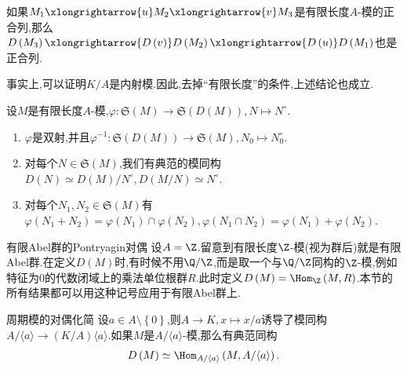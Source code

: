 \begin{proposition}{}{}
	如果$M_{1}\xlongrightarrow{u}M_{2}\xlongrightarrow{v}M_{3}$是有限长度$A$-模的正合列,那么$D\left(M_{3}\right)\xlongrightarrow{D\left(v\right)}D\left(M_{2}\right)\xlongrightarrow{D\left(u\right)}D\left(M_{1}\right)$也是正合列.
\end{proposition}

\begin{remark}{}{}
	事实上,可以证明$K/A$是内射模.因此,去掉``有限长度''的条件,上述结论也成立.
\end{remark}

\begin{proposition}{}{}
	设$M$是有限长度$A$-模,$\varphi:\mathfrak{S}\left(M\right)\to\mathfrak{S}\left(D\left(M\right)\right),N\mapsto N^{\circ}$.
	\begin{enumerate}
		\item $\varphi$是双射,并且$\varphi^{-1}:\mathfrak{S}\left(D\left(M\right)\right)\to\mathfrak{S}\left(M\right),N_{0}\mapsto N_{0}^{\circ}$.
		\item 对每个$N\in\mathfrak{S}\left(M\right)$,我们有典范的模同构$D\left(N\right)\simeq D\left(M\right)/N^{\circ},D\left(M/N\right)\simeq N^{\circ}$.
		\item 对每个$N_{1},N_{2}\in\mathfrak{S}\left(M\right)$有$\varphi\left(N_{1}+N_{2}\right)=\varphi\left(N_{1}\right)\cap\varphi\left(N_{2}\right),\varphi\left(N_{1}\cap N_{2}\right)=\varphi\left(N_{1}\right)+\varphi\left(N_{2}\right)$.
	\end{enumerate}
\end{proposition}

\begin{example}{有限Abel群的Pontryagin对偶}{}
	设$A=\Z$.留意到有限长度$\Z$-模(视为群后)就是有限Abel群.在定义$D\left(M\right)$时,有时候不用$\Q/\Z$,而是取一个与$\Q/\Z$同构的$\Z$-模,例如特征为$0$的代数闭域上的乘法单位根群$R$.此时定义$D\left(M\right)=\Hom_{\Z}\left(M,R\right)$.本节的所有结果都可以用这种记号应用于有限Abel群上.
\end{example}

\begin{example}{周期模的对偶化简}{}
	设$a\in A\setminus\left\{0\right\}$,则$A\to K,x\mapsto x/a$诱导了模同构$A/\langle a\rangle\to(K/A)\langle a\rangle$.如果$M$是$A/\langle a\rangle$-模,那么有典范同构
	\begin{align*}
		D\left(M\right)\simeq\Hom_{A/\langle a\rangle}\left(M,A/\langle a\rangle\right).
	\end{align*}
\end{example}



























